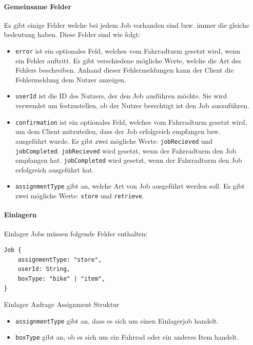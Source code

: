 \paragraph{Gemeinsame Felder}

Es gibt einige Felder welche bei jedem Job vorhanden sind bzw. immer die gleiche bedeutung haben. Diese Felder sind wie folgt:

\begin{itemize}
  \item \texttt{error} ist ein optionales Feld, welches vom Fahrradturm gesetzt wird, wenn ein Fehler auftritt. Es gibt verschiedene mögliche Werte, welche die Art des Fehlers beschreiben. Anhand dieser Fehlermeldungen kann der Client die Fehlermeldung dem Nutzer anzeigen.
  \item \texttt{userId} ist die ID des Nutzers, der den Job ausführen möchte. Sie wird verwendet um festzustellen, ob der Nutzer berechtigt ist den Job auszuführen.
  \item \texttt{confirmation} ist ein optionales Feld, welches vom Fahrradturm gesetzt wird, um dem Client mitzuteilen, dass der Job erfolgreich empfangen bzw. ausgeführt wurde. Es gibt zwei mögliche Werte: \texttt{jobRecieved} und \texttt{jobCompleted}. \texttt{jobRecieved} wird gesetzt, wenn der Fahrradturm den Job empfangen hat. \texttt{jobCompleted} wird gesetzt, wenn der Fahrradturm den Job erfolgreich ausgeführt hat.
  \item \texttt{assignmentType} gibt an, welche Art von Job ausgeführt werden soll. Es gibt zwei mögliche Werte: \texttt{store} und \texttt{retrieve}.
\end{itemize}


\paragraph{Einlagern}

Einlager Jobs müssen folgende Felder enthalten:

\begin{listing}[H]
  \begin{verbatim}
Job {
    assignmentType: "store",
    userId: String,
    boxType: "bike" | "item",
}
\end{verbatim}
  \caption{Einlager Anfrage Assignment Struktur}
  \label{lst:einlager_assignment_struktur}
\end{listing}

\begin{itemize}
  \item \texttt{assignmentType} gibt an, dass es sich um einen Einlagerjob handelt.
  \item \texttt{boxType} gibt an, ob es sich um ein Fahrrad oder ein anderes Item handelt.
\end{itemize}

